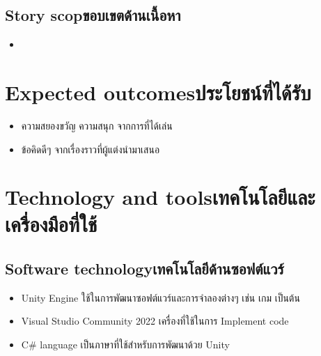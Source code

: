 \subsection{\ifenglish Story scop\else ขอบเขตด้านเนื้อหา\fi}
\begin{itemize}
    \item 
\end{itemize}



\section{\ifenglish Expected outcomes\else ประโยชน์ที่ได้รับ\fi}
\begin{itemize}
    \item ความสยองขวัญ ความสนุก จากการที่ได้เล่น
    \item ข้อคิดดีๆ จากเรื่องราวที่ผู้แต่งนำมาเสนอ
\end{itemize}

\section{\ifenglish Technology and tools\else เทคโนโลยีและเครื่องมือที่ใช้\fi}


\subsection{\ifenglish Software technology\else เทคโนโลยีด้านซอฟต์แวร์\fi}
\begin{itemize}
    \item Unity Engine ใช้ในการพัฒนาซอฟต์แวร์และการจำลองต่างๆ เช่น เกม เป็นต้น
    \item Visual Studio Community 2022 เครื่องที่ใช้ในการ Implement code
    \item C$\#$ language เป็นภาษาที่ใช้สำหรับการพัฒนาด้วย Unity
\end{itemize}

